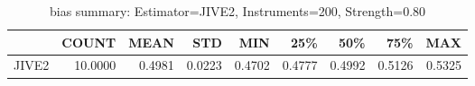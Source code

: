 \begin{table}[ht]
\centering
\caption{bias summary: Estimator=JIVE2, Instruments=200, Strength=0.80}
\begin{tabular}{lrrrrrrrr}
\toprule
 & COUNT & MEAN & STD & MIN & 25\% & 50\% & 75\% & MAX \\
\midrule
JIVE2 & 10.0000 & 0.4981 & 0.0223 & 0.4702 & 0.4777 & 0.4992 & 0.5126 & 0.5325 \\
\bottomrule
\end{tabular}
\end{table}
